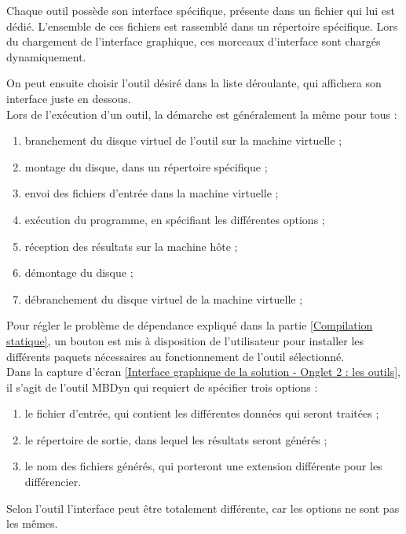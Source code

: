 Chaque outil possède son interface spécifique, présente dans un fichier qui lui est dédié.
L'ensemble de ces fichiers est rassemblé dans un répertoire spécifique.
Lors du chargement de l'interface graphique, ces morceaux d'interface sont chargés dynamiquement.

On peut ensuite choisir l'outil désiré dans la liste déroulante, qui affichera son interface juste en dessous.
\\


Lors de l'exécution d'un outil, la démarche est généralement la même pour tous :
\begin{enumerate}
	\item branchement du disque virtuel de l'outil sur la machine virtuelle ;
	\item montage du disque, dans un répertoire spécifique ;
	\item envoi des fichiers d'entrée dans la machine virtuelle ;
	\item exécution du programme, en spécifiant les différentes options ;
	\item réception des résultats sur la machine hôte ;
	\item démontage du disque ;
	\item débranchement du disque virtuel de la machine virtuelle ;
\\
\end{enumerate}


Pour régler le problème de dépendance expliqué dans la partie \ref{Compilation statique}, un bouton est mis à disposition de l'utilisateur pour installer les différents paquets nécessaires au fonctionnement de l'outil sélectionné.
\\


Dans la capture d'écran \ref{Interface graphique de la solution - Onglet 2 : les outils}, il s'agit de l'outil MBDyn qui requiert de spécifier trois options :
\begin{enumerate}
	\item le fichier d'entrée, qui contient les différentes données qui seront traitées ;
	\item le répertoire de sortie, dans lequel les résultats seront générés ;
	\item le nom des fichiers générés, qui porteront une extension différente pour les différencier.
\end{enumerate}
Selon l'outil l'interface peut être totalement différente, car les options ne sont pas les mêmes.
\\



